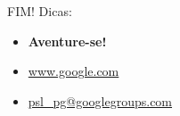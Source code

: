 \documentclass[size=14pt,
style=paintings
]{powerdot}
\newenvironment{vslide}{\vspace{\stretch{1}}}{\vspace{\stretch{1}}}
\begin{document}
\begin{slide}{FIM!}
\begin{vslide}
Dicas:
\begin{itemize}
\setlength{\itemsep}{0.5cm}
\item	\textbf{Aventure-se!}
\item	\url{www.google.com}
\item	\url{psl\_pg@googlegroups.com}
\end{itemize}
\end{vslide}
\end{slide}
\end{document}
